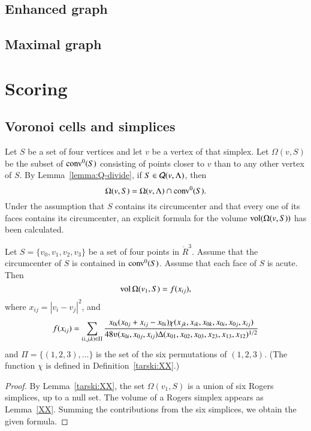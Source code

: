 \subsection{Enhanced graph}
\subsection{Maximal graph}

\section{Scoring}





\subsection{Voronoi cells and simplices}


Let $S$ be a set of four vertices and let $v$ be a vertex of that simplex. Let
$\Omega(v,S)$ be the subset of ${\operatorname{conv}}^0(S)$ consisting of points closer
to $v$ than to any other vertex of $S$. By
Lemma~\ref{lemma:Q-divide}, if $S\in{\mathcal Q}(v,\Lambda)$, then
$$\Omega(v,S) = \Omega(v,\Lambda)\cap{\operatorname{conv}}^0(S).$$
Under the assumption that $S$ contains its circumcenter and that
every one of its faces contains its circumcenter, an explicit
formula for the volume ${\operatorname{vol}}(\Omega(v,S))$ has been
calculated.  %


\begin{lemma}  Let $S = \{v_0,v_1,v_2,v_3\}$ be a set of four points in $\ring{R}^3$.
Assume that the circumcenter of $S$ is contained in ${\operatorname{conv}}^0(S)$.  Assume
that each face of $S$ is acute.
Then 
  $$
  {\operatorname{vol}}\,\Omega(v_1,S) = f(x_{ij}),
  $$ 
where $x_{ij} = |v_i-v_j|^2$, and
$$
   f(x_{ij}) = \sum_{(i,j,k)\in \Pi} \frac{x_{0i} (x_{0j}+x_{ij}-x_{0i})\chi(x_{jk},x_{ik},x_{0k},x_{0i},x_{0j},x_{ij})}
   {48\ups(x_{0i},x_{0j},x_{ij})\Delta(x_{01},x_{02},x_{03},x_{23},x_{13},x_{12})^{1/2}}
$$
and $\Pi = \{(1,2,3),\ldots\}$ is the set of the six permutations of $(1,2,3)$.
(The function $\chi$ is defined in Definition~\ref{tarski:XX}.)
\end{lemma}

\begin{proof} By Lemma~\ref{tarski:XX}, the set $\Omega(v_1,S)$ is a union of
six Rogers simplices, up to a null set.  The volume of a Rogers simplex appears
as Lemma~\ref{XX}.  Summing the contributions from the six simplices, we obtain
the given formula.
\end{proof}

